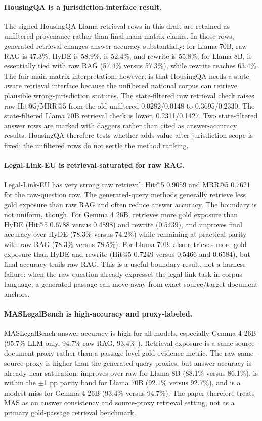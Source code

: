 \paragraph{HousingQA is a jurisdiction-interface result.}
The signed HousingQA Llama retrieval rows in this draft are retained as
unfiltered provenance rather than final main-matrix claims. In those rows,
generated retrieval changes answer accuracy substantially: for Llama 70B, raw
RAG is 47.3\%, HyDE is 58.9\%, \hyre{} is 52.4\%, and rewrite is 55.8\%; for
Llama 8B, \hyre{} is essentially tied with raw RAG (57.4\% versus 57.3\%),
while rewrite reaches 63.4\%. The fair main-matrix interpretation, however, is
that HousingQA needs a state-aware retrieval interface because the unfiltered
national corpus can retrieve plausible wrong-jurisdiction statutes. The
state-filtered raw retrieval check raises raw Hit@5/MRR@5 from the old
unfiltered 0.0282/0.0148 to 0.3695/0.2330. The state-filtered Llama 70B
\hyre{} retrieval check is lower, 0.2311/0.1427. Two state-filtered answer
rows are marked with daggers rather than cited as answer-accuracy results.
HousingQA therefore tests whether \hyre{} adds value after jurisdiction scope
is fixed; the unfiltered rows do not settle the method ranking.

\paragraph{Legal-Link-EU is retrieval-saturated for raw RAG.}
Legal-Link-EU has very strong raw retrieval: Hit@5 0.9059 and MRR@5 0.7621
for the raw-question row. The generated-query methods generally retrieve less
gold exposure than raw RAG and often reduce answer accuracy. The boundary is
not uniform, though. For Gemma 4 26B, \hyre{} retrieves more gold exposure than
HyDE (Hit@5 0.6788 versus 0.4898) and rewrite (0.5439), and improves final
accuracy over HyDE (78.3\% versus 74.2\%) while remaining at practical parity
with raw RAG (78.3\% versus 78.5\%). For Llama 70B, \hyre{} also retrieves
more gold exposure than HyDE and rewrite (Hit@5 0.7249 versus 0.5466 and
0.6584), but final accuracy trails raw RAG. This is a useful boundary result,
not a harness failure: when the raw question already expresses the legal-link
task in corpus language, a generated passage can move away from exact
source/target document anchors.

\paragraph{MASLegalBench is high-accuracy and proxy-labeled.}
MASLegalBench answer accuracy is high for all models, especially Gemma 4 26B
(95.7\% LLM-only, 94.7\% raw RAG, 93.4\% \hyre{}). Retrieval exposure is a
same-source-document proxy rather than a passage-level gold-evidence metric.
The raw same-source proxy is higher than the generated-query proxies, but
answer accuracy is already near saturation: \hyre{} improves over raw for
Llama 8B (88.1\% versus 86.1\%), is within the $\pm$1 pp parity band for
Llama 70B (92.1\% versus 92.7\%), and is a modest miss for Gemma 4 26B
(93.4\% versus 94.7\%). The paper therefore treats MAS as an answer
consistency and source-proxy retrieval setting, not as a primary gold-passage
retrieval benchmark.

